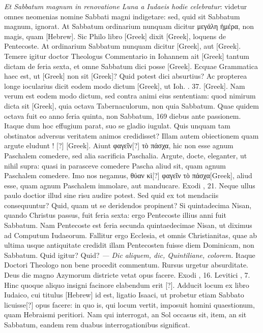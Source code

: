 \textit{Et Sabbatum magnum in renovatione Luna a Iudaeis
hodie celebratur}: videtur omnes neomenias nomine Sabbati
magni indigetare: sed, quid sit Sabbatum magnum, ignorat.
At
Sabbatum ordinarium nunquam dicitur \textgreek{μεγάλη ἡμέρα},
 non magis,
quam \texthebrew{[Hebrew]}.
Sic Philo libro \textgreek{[Greek]} dixit \textgreek{[Greek]},
loquens de Pentecoste.
At ordinarium
Sabbatum nunquam dicitur \textgreek{[Greek]}, aut \textgreek{[Greek]}.
Temere igitur
doctor Theologus Commentario in Iohannem ait \textgreek{[Greek]}
tantum dictam de feria sexta, et omne Sabbatum dici posse \textgreek{[Greek]}.
Ecquae Grammatica haec est, ut \textgreek{[Greek]}
non sit \textgreek{[Greek]}?
Quid potest dici absurtius?
Ac propterea
longe iocularius dicit eodem modo dictum \textgreek{[Greek]},
ut Ioh. . 37. \textgreek{[Greek]}.
Nam verum est eodem modo dictum, sed
contra animi eius sententiam: quod nimirum dicta sit \textgreek{[Greek]},
quia octava Tabernaculorum, non quia Sabbatum.
Quae quidem
octava fuit eo anno feria quinta, non Sabbatum, 169 diebus ante
passionem.
Itaque dum hoc effugium parat, suo se gladio iugulat.
Quis unquam tam obstinatos adversus veritatem animos credidisset?
Illam autem obiectionem quam argute eludunt ! [?] \textgreek{[Greek]}.
Aiunt \textgreek{φαγεῖν[?] τὸ πάσχα}, hic non esse
agnum Paschalem comedere, sed alia sacrificia Paschalia.
Argute, docte, eleganter, ut nihil supra: quasi in parasceve comedere
Pascha aliud sit, quam agnum Paschalem comedere.
Imo nos negamus, \textgreek{θύαν κὶ[?] φαγεῖν τὸ πάσχα[Greek]},
 aliud esse, quam agnum Paschalem
immolare, aut manducare.
Exodi , 21.
Neque ullus paulo doctior illud sine risu audire potest.
Sed quid ex tot mendaciis consequuntur?
Quid, quam ut se deridendos propinent?
Si quintadecima Nisan, quando Christus passus, fuit feria sexta:
 ergo Pentecoste
illius anni fuit Sabbatum.
Nam Pentecoste est feria secunda
quintaedecimae Nisan, ut diximus ad Computum Iudaeorum.
Fallitur ergo Ecclesia, et omnis Christianitas, quae ab ultima usque
 antiquitate
credidit illam Pentecosten fuisse diem Dominicam, non
Sabbatum.
Quid igitur?
Quid?
\textit{— Dic aliquem, dic, Quintiliane, colorem.}
Itaque Doctori Theologo non bene procedit commentum.
Rursus urgetur absurditate.
Deus die magno Azymorum districte
vetat opus facere.
Exodi , 16.
Levitici , 7.
Hinc quoque
aliquo insigni facinore elabendum erit [?].
Adducit locum ex libro Iudaico,
cui titulus \texthebrew{[Hebrew]} id est, ligatio Isaaci, ut probetur etiam
Sabbato licuisse[?] opus facere: in quo is, qui locum vertit, imposuit homini
quaestionum, quam Hebraismi peritiori.
Nam qui interrogat,
an Sol occasus sit, item, an sit Sabbatum, eandem rem duabus interrogationibus
significat.

